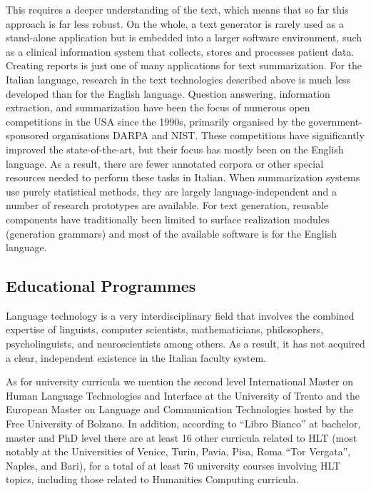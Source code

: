 \documentclass[]{../../metanetpaper}
\begin{document}
\begin{multicols}{2}
 

This requires a deeper understanding of the text, which means that so far this approach is far less robust. On the whole, a text generator is rarely used as a stand-alone application but is embedded into a larger software environment, such as a clinical information system that collects, stores and processes patient data. Creating reports is just one of many applications for text summarization. For the Italian language, research in the text technologies described above is much less developed than for the English language. Question answering, information extraction, and summarization have been the focus of numerous open competitions in the USA since the 1990s, primarily organised by the government-sponsored organisations DARPA and NIST. These competitions have significantly improved the state-of-the-art, but their focus has mostly been on the English language. As a result, there are fewer annotated corpora or other special resources needed to perform these tasks in Italian. When summarization systems use purely statistical methods, they are largely language-independent and a number of research prototypes are available. For text generation, reusable components have traditionally been limited to surface realization modules (generation grammars) and most of the available software is for the English language.





\subsection{Educational Programmes}

Language technology is a very interdisciplinary field that involves the combined expertise of linguists, computer scientists, mathematicians, philosophers, psycholinguists, and neuroscientists among others. As a result, it has not acquired a clear, independent existence in the Italian faculty system.

As for university curricula we mention the second level International Master
on Human Language Technologies and Interface at the University of Trento and
the European Master on Language and Communication Technologies hosted by the
Free University of Bolzano. In addition, according to “Libro Bianco” at
bachelor, master and PhD level there are at least 16 other curricula related
to HLT (most notably at the Universities of Venice, Turin, Pavia, Pisa, Roma
“Tor Vergata”, Naples, and Bari), for a total of at least 76 university
courses involving HLT topics, including those related to Humanities Computing curricula.




\end{multicols}
\end{document}
